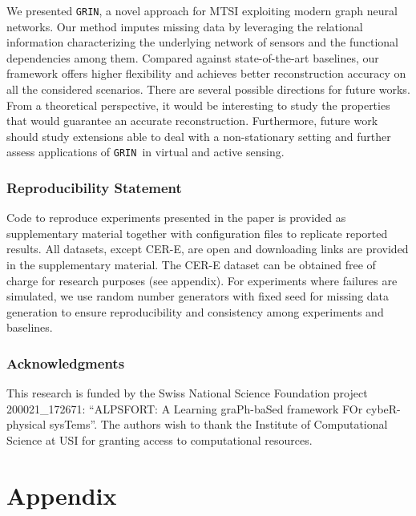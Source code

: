 \documentclass{article} \usepackage{iclr2022_conference,times}
\newcommand{\GRIL}{\texttt{GRIN}}
\begin{document}
We presented \GRIL, a novel approach for MTSI exploiting modern graph neural networks. Our method imputes missing data by leveraging the relational information characterizing the underlying network of sensors and the functional dependencies among them. Compared against state-of-the-art baselines, our framework offers higher flexibility and achieves better reconstruction accuracy on all the considered scenarios. 
There are several possible directions for future works. From a theoretical perspective, it would be interesting to study the properties that would guarantee an accurate reconstruction. Furthermore, future work should study extensions able to deal with a non-stationary setting and further assess applications of \GRIL\ in virtual and active sensing. 





\clearpage

\subsubsection*{Reproducibility Statement}

Code to reproduce experiments presented in the paper is provided as supplementary material together with configuration files to replicate reported results. All datasets, except CER-E, are open and downloading links are provided in the supplementary material. The CER-E dataset can be obtained free of charge for research purposes (see appendix). For experiments where failures are simulated, we use random number generators with fixed seed for missing data generation to ensure reproducibility and consistency among experiments and baselines.  

\subsubsection*{Acknowledgments}

This research is funded by the Swiss National Science Foundation project 200021\_172671: ``ALPSFORT: A Learning graPh-baSed framework FOr cybeR-physical sysTems''. The authors wish to thank the Institute of Computational Science at USI for granting access to computational resources.







\clearpage
\appendix
\section*{Appendix}
\end{document}
